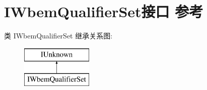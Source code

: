 \hypertarget{interface_i_wbem_qualifier_set}{}\section{I\+Wbem\+Qualifier\+Set接口 参考}
\label{interface_i_wbem_qualifier_set}
类 I\+Wbem\+Qualifier\+Set 继承关系图\+:\begin{figure}[H]
\begin{center}
\leavevmode
\includegraphics[height=2.000000cm]{interface_i_wbem_qualifier_set}
\end{center}
\end{figure}
